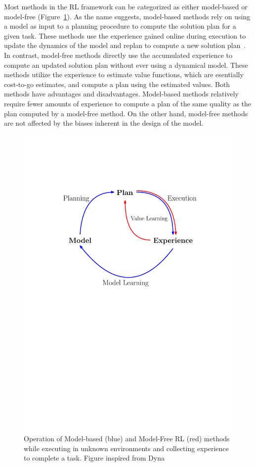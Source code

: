 Most methods in the RL framework can be categorized as either model-based
or model-free (Figure~\ref{fig:dyna}). As the name suggests, model-based methods rely on
using a model as input to a planning procedure to compute the solution
plan for a given task. These methods use the experience gained online
during execution to update the dynamics of the model and replan to
compute a new solution plan~\cite{DBLP:journals/sigart/Sutton91}. In
contrast, model-free methods directly 
use the accumulated experience to compute an updated solution plan
without ever using a dynamical model. These methods utilize the
experience to estimate value functions, which are esentially
cost-to-go estimates, and compute a plan using the estimated
values. Both methods have advantages and disadvantages. Model-based
methods relatively require fewer amounts of experience to compute a
plan of the same quality as the plan computed by a model-free
method. On the other hand, model-free methods are not affected by the biases
inherent in the design of the model.

\begin{figure}[t]
  \centering
  \includegraphics[width=0.5\linewidth]{Figures/intro/dyna.pdf}
  \caption{Operation of Model-based (blue) and Model-Free RL (red) methods
    while executing in unknown environments and collecting
    experience to complete a task. Figure inspired from Dyna~\cite{DBLP:journals/sigart/Sutton91}}
  \label{fig:dyna}
\end{figure}

